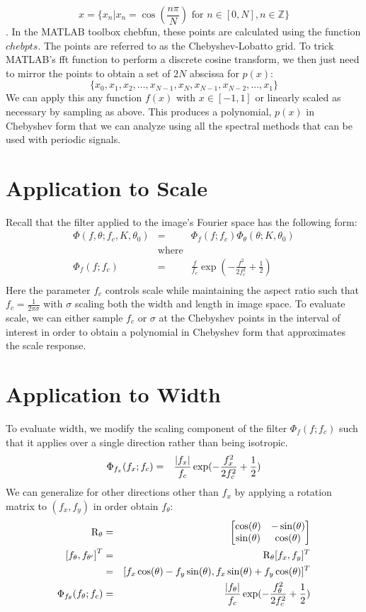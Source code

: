 \documentclass{article}
\DeclarePairedDelimiter\abs{\lvert}{\rvert}%
\begin{document}
\[ x = \{ x_n | x_n = \cos(\frac{n\pi}{N}) \mbox{ for } n \in [0,N], n \in \mathbb{Z} \} \].
In the MATLAB toolbox chebfun, these points are calculated using the function $ chebpts $. The points are referred to as the Chebyshev-Lobatto grid. To trick MATLAB's fft function to perform a discrete cosine transform, we then just need to mirror the points to obtain a set of $ 2N $ abscissa for $ p(x) $:
\[ \{x_0, x_1, x_2, \hdots, x_{N-1}, x_N, x_{N-1}, x_{N-2}, \hdots, x_1\} \]
We can apply this any function $ f(x) $ with $ x \in [-1,1] $ or linearly scaled as necessary by sampling as above. This produces a polynomial, $ p(x) $ in Chebyshev form that we can analyze using all the spectral methods that can be used with periodic signals.
\section{Application to Scale}
Recall that the filter applied to the image's Fourier space has the following form:
\begin{eqnarray}
    \Phi(f,\theta; f_c, K, \theta_0) & = & \Phi_f(f; f_c) \Phi_\theta(\theta; K, \theta_0) \\
    & \mbox{where} & \nonumber \\
    \Phi_f(f; f_c) & = & \frac{f}{f_c} \exp(-\frac{f^2}{2f_c^2}+\frac{1}{2}) \\
\end{eqnarray}
Here the parameter $ f_c $ controls scale while maintaining the aspect ratio such that $ f_c = \frac{1}{2\pi \sigma} $ with $ \sigma $ scaling both the width and length in image space. To evaluate scale, we can either sample $ f_c $ or $ \sigma $ at the Chebyshev points in the interval of interest in order to obtain a polynomial in Chebyshev form that approximates the scale response.
\section{Application to Width}
To evaluate width, we modify the scaling component of the filter $ \Phi_f(f; f_c) $ such that it applies over a single direction rather than being isotropic.
\begin{eqnarray}
	\Phi_{f_x}(f_x; f_c) & = & \frac{\abs {f_x}}{f_c} \exp(-\frac{f_x^2}{2f_c^2}+\frac{1}{2})
\end{eqnarray}
We can generalize for other directions other than $ f_x $ by applying a rotation matrix to $ (f_x,f_y) $ in order obtain $ f_\theta $:
\begin{eqnarray}
    \mathrm{R}_\theta & = &
    \begin{bmatrix}
        \cos(\theta) & -\sin(\theta) \\
        \sin(\theta) & \cos(\theta)
    \end{bmatrix} \\
   \left[f_{\theta},f_{\theta'}\right]^T  & = & \mathrm{R}_\theta [f_x,f_y]^T \\
    & = & [ f_x\cos(\theta)  -f_y \sin(\theta) , f_x \sin(\theta) + f_y \cos(\theta) ]^T  \\
    \Phi_{f_\theta}(f_\theta; f_c) & = & \frac{\abs {f_\theta}}{f_c} \exp(-\frac{f_\theta^2}{2f_c^2}+\frac{1}{2}) 
\end{eqnarray}
\end{document}
